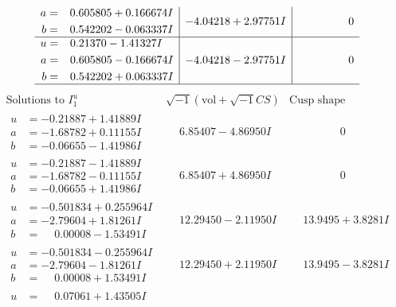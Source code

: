 \documentclass[1p]{elsarticle_modified}
\theoremstyle{definition}
\newcommand{\I}{\sqrt{-1}}
\begin{document}
$$\begin{array}{c|c|c}
\begin{aligned}
a &= \phantom{-}0.605805 + 0.166674 I \\
b &= \phantom{-}0.542202 - 0.063337 I\end{aligned}
 & -4.04218 + 2.97751 I & \phantom{-0.000000 } 0 \\ \hline\begin{aligned}
u &= \phantom{-}0.21370 - 1.41327 I \\
a &= \phantom{-}0.605805 - 0.166674 I \\
b &= \phantom{-}0.542202 + 0.063337 I\end{aligned}
 & -4.04218 - 2.97751 I & \phantom{-0.000000 } 0\\
 \hline 
 \end{array}$$\newpage$$\begin{array}{c|c|c}  
\text{Solutions to }I^u_{1}& \I (\text{vol} + \sqrt{-1}CS) & \text{Cusp shape}\\
 \hline 
\begin{aligned}
u &= -0.21887 + 1.41889 I \\
a &= -1.68782 + 0.11155 I \\
b &= -0.06655 - 1.41986 I\end{aligned}
 & \phantom{-}6.85407 - 4.86950 I & \phantom{-0.000000 } 0 \\ \hline\begin{aligned}
u &= -0.21887 - 1.41889 I \\
a &= -1.68782 - 0.11155 I \\
b &= -0.06655 + 1.41986 I\end{aligned}
 & \phantom{-}6.85407 + 4.86950 I & \phantom{-0.000000 } 0 \\ \hline\begin{aligned}
u &= -0.501834 + 0.255964 I \\
a &= -2.79604 + 1.81261 I \\
b &= \phantom{-}0.00008 - 1.53491 I\end{aligned}
 & \phantom{-}12.29450 - 2.11950 I & \phantom{-}13.9495 + 3.8281 I \\ \hline\begin{aligned}
u &= -0.501834 - 0.255964 I \\
a &= -2.79604 - 1.81261 I \\
b &= \phantom{-}0.00008 + 1.53491 I\end{aligned}
 & \phantom{-}12.29450 + 2.11950 I & \phantom{-}13.9495 - 3.8281 I \\ \hline\begin{aligned}
u &= \phantom{-}0.07061 + 1.43505 I \\

\end{aligned}
\end{array}$$
\end{document}
